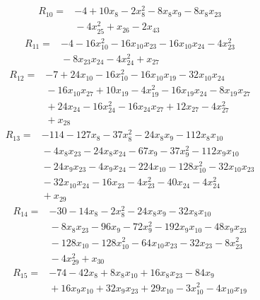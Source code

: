 {%
\begin{align*}
R_{10} ={}& -4 + 10x_{8} - 2x_{8}^{2} - 8x_{8} x_{9} - 8x_{8} x_{23} \\
&{}  - 4x_{25}^{2} + x_{26} - 2x_{43}
\end{align*}
\begin{align*}
R_{11} ={}& -4 - 16x_{10}^{2} - 16x_{10} x_{23} - 16x_{10} x_{24} - 4x_{23}^{2} \\
&{}  - 8x_{23} x_{24} - 4x_{24}^{2} + x_{27}
\end{align*}
\begin{align*}
R_{12} ={}& -7 + 24x_{10} - 16x_{10}^{2} - 16x_{10} x_{19} - 32x_{10} x_{24} \\
&{}  - 16x_{10} x_{27} + 10x_{19} - 4x_{19}^{2} - 16x_{19} x_{24} - 8x_{19} x_{27} \\
&{}  + 24x_{24} - 16x_{24}^{2} - 16x_{24} x_{27} + 12x_{27} - 4x_{27}^{2} \\
&{}  + x_{28}
\end{align*}
\begin{align*}
R_{13} ={}& -114 - 127x_{8} - 37x_{8}^{2} - 24x_{8} x_{9} - 112x_{8} x_{10} \\
&{}  - 4x_{8} x_{23} - 24x_{8} x_{24} - 67x_{9} - 37x_{9}^{2} - 112x_{9} x_{10} \\
&{}  - 24x_{9} x_{23} - 4x_{9} x_{24} - 224x_{10} - 128x_{10}^{2} - 32x_{10} x_{23} \\
&{}  - 32x_{10} x_{24} - 16x_{23} - 4x_{23}^{2} - 40x_{24} - 4x_{24}^{2} \\
&{}  + x_{29}
\end{align*}
\begin{align*}
R_{14} ={}& -30 - 14x_{8} - 2x_{8}^{2} - 24x_{8} x_{9} - 32x_{8} x_{10} \\
&{}  - 8x_{8} x_{23} - 96x_{9} - 72x_{9}^{2} - 192x_{9} x_{10} - 48x_{9} x_{23} \\
&{}  - 128x_{10} - 128x_{10}^{2} - 64x_{10} x_{23} - 32x_{23} - 8x_{23}^{2} \\
&{}  - 4x_{29}^{2} + x_{30}
\end{align*}
\begin{align*}
R_{15} ={}& -74 - 42x_{8} + 8x_{8} x_{10} + 16x_{8} x_{23} - 84x_{9} \\
&{}  + 16x_{9} x_{10} + 32x_{9} x_{23} + 29x_{10} - 3x_{10}^{2} - 4x_{10} x_{19} \\

\end{align*}}
